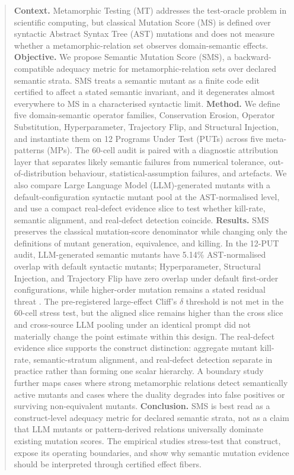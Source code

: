 \documentclass[review,12pt,authoryear]{elsarticle}
\begin{document}
\begin{frontmatter}
\begin{abstract}
\noindent\textbf{Context.} Metamorphic Testing (MT) addresses the test-oracle problem in scientific computing, but classical Mutation Score (MS) is defined over syntactic Abstract Syntax Tree (AST) mutations and does not measure whether a metamorphic-relation set observes domain-semantic effects.
\textbf{Objective.} We propose Semantic Mutation Score (SMS), a backward-compatible adequacy metric for metamorphic-relation sets over declared semantic strata. SMS treats a semantic mutant as a finite code edit certified to affect a stated semantic invariant, and it degenerates almost everywhere to MS in a characterised syntactic limit.
\textbf{Method.} We define five domain-semantic operator families, Conservation Erosion, Operator Substitution, Hyperparameter, Trajectory Flip, and Structural Injection, and instantiate them on 12 Programs Under Test (PUTs) across five meta-patterns (MPs). The 60-cell audit is paired with a diagnostic attribution layer that separates likely semantic failures from numerical tolerance, out-of-distribution behaviour, statistical-assumption failures, and artefacts. We also compare Large Language Model (LLM)-generated mutants with a default-configuration syntactic mutant pool at the AST-normalised level, and use a compact real-defect evidence slice to test whether kill-rate, semantic alignment, and real-defect detection coincide.
\textbf{Results.} SMS preserves the classical mutation-score denominator while changing only the definitions of mutant generation, equivalence, and killing. In the 12-PUT audit, LLM-generated semantic mutants have 5.14\% AST-normalised overlap with default syntactic mutants; Hyperparameter, Structural Injection, and Trajectory Flip have zero overlap under default first-order configurations, while higher-order mutation remains a stated residual threat \citep{jia2008subtle}. The pre-registered large-effect Cliff's $\delta$ threshold \citep{romano2006cliff} is not met in the 60-cell stress test, but the aligned slice remains higher than the cross slice and cross-source LLM pooling under an identical prompt did not materially change the point estimate within this design. The real-defect evidence slice supports the construct distinction: aggregate mutant kill-rate, semantic-stratum alignment, and real-defect detection separate in practice rather than forming one scalar hierarchy. A boundary study further maps cases where strong metamorphic relations detect semantically active mutants and cases where the duality degrades into false positives or surviving non-equivalent mutants.
\textbf{Conclusion.} SMS is best read as a construct-level adequacy metric for declared semantic strata, not as a claim that LLM mutants or pattern-derived relations universally dominate existing mutation scores. The empirical studies stress-test that construct, expose its operating boundaries, and show why semantic mutation evidence should be interpreted through certified effect fibers.
\end{abstract}


\end{frontmatter}
\end{document}
